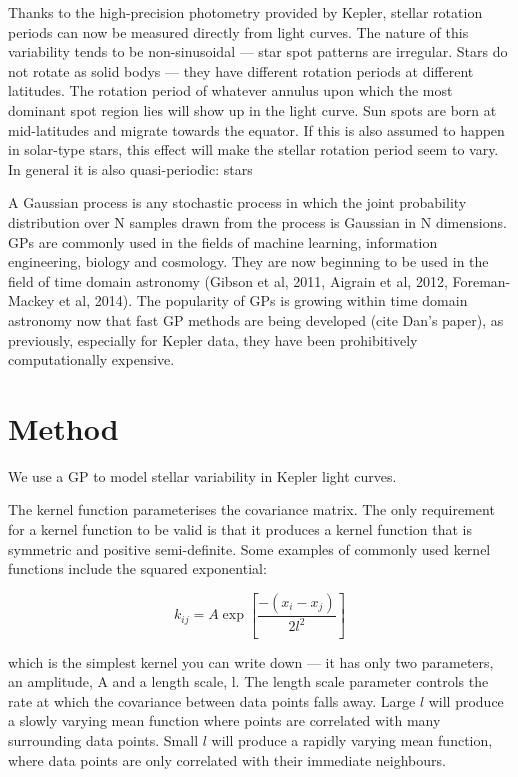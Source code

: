 \documentclass[12pt,preprint]{aastex}
\begin{document}
Thanks to the high-precision photometry provided by Kepler, stellar rotation periods can now be measured directly from light curves.
The nature of this variability tends to be non-sinusoidal --- star spot patterns are irregular.
Stars do not rotate as solid bodys --- they have different rotation periods at different latitudes.
The rotation period of whatever annulus upon which the most dominant spot region lies will show up in the light curve.
Sun spots are born at mid-latitudes and migrate towards the equator.
If this is also assumed to happen in solar-type stars, this effect will make the stellar rotation period seem to vary.
In general it is also quasi-periodic: stars

A Gaussian process is any stochastic process in which the joint probability distribution over N samples drawn from the process is Gaussian in N dimensions.
GPs are commonly used in the fields of machine learning, information engineering, biology and cosmology.
They are now beginning to be used in the field of time domain astronomy (Gibson et al, 2011, Aigrain et al, 2012, Foreman-Mackey et al, 2014).
The popularity of GPs is growing within time domain astronomy now that fast GP methods are being developed (cite Dan's paper), as previously, especially for Kepler data, they have been prohibitively computationally expensive.

\section{Method}

We use a GP to model stellar variability in Kepler light curves.

The kernel function parameterises the covariance matrix.
The only requirement for a kernel function to be valid is that it produces a kernel function that is symmetric and positive semi-definite.
Some examples of commonly used kernel functions include the squared exponential:

\begin{equation}
	k_{ij} = A\exp\left[{\frac{-(x_i-x_j)}{2l^2}}\right]
\end{equation}

which is the simplest kernel you can write down --- it has only two parameters, an amplitude, A and a length scale, l.
The length scale parameter controls the rate at which the covariance between data points falls away.
Large $l$ will produce a slowly varying mean function where points are correlated with many surrounding data points.
Small $l$ will produce a rapidly varying mean function, where data points are only correlated with their immediate neighbours.
\end{document}
